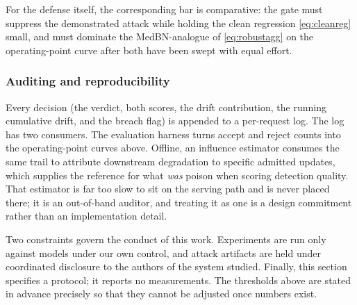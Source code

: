 \documentclass[journal]{IEEEtran}
\begin{document}
For the defense itself, the corresponding bar is comparative: the gate must suppress
the demonstrated attack while holding the clean regression \eqref{eq:cleanreg} small,
and must dominate the MedBN-analogue of \eqref{eq:robustagg} on the operating-point
curve after both have been swept with equal effort.

\subsubsection{Auditing and reproducibility}
Every decision (the verdict, both scores, the drift contribution, the running
cumulative drift, and the breach flag) is appended to a per-request log. The log
has two consumers. The evaluation harness turns accept and reject counts into the
operating-point curves above. Offline, an influence estimator consumes the same trail
to attribute downstream degradation to specific admitted updates, which supplies the
reference for what \emph{was} poison when scoring detection quality. That estimator
is far too slow to sit on the serving path and is never placed there; it is an
out-of-band auditor, and treating it as one is a design commitment rather than an
implementation detail.

Two constraints govern the conduct of this work. Experiments are run only against
models under our own control, and attack artifacts are held under coordinated
disclosure to the authors of the system studied. Finally, this section specifies a
protocol; it reports no measurements. The thresholds above are stated in advance
precisely so that they cannot be adjusted once numbers exist.
\end{document}
